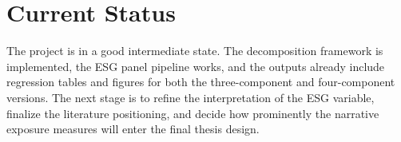 \documentclass[12pt]{article}
\begin{document}
\section*{Current Status}
The project is in a good intermediate state. The decomposition framework is implemented, the ESG panel pipeline works, and the outputs already include regression tables and figures for both the three-component and four-component versions. The next stage is to refine the interpretation of the ESG variable, finalize the literature positioning, and decide how prominently the narrative exposure measures will enter the final thesis design.
\end{document}
